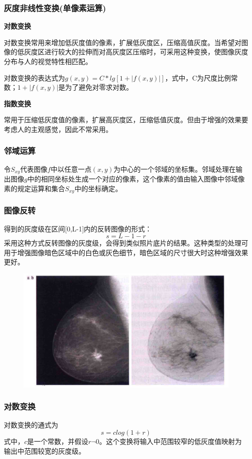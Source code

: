 \documentclass[11pt]{article}
\begin{document}
\subsubsection{灰度非线性变换(单像素运算)}
\textbf{对数变换}

对数变换常用来增加低灰度值的像素，扩展低灰度区，压缩高值灰度。当希望对图像的低灰度区进行较大的拉伸而对高灰度区压缩时，可采用这种变换，使图像灰度分布与人的视觉特性相匹配。

对数变换的表达式为$g(x,y) = C * lg[1+|f(x,y)|]$，式中，C为尺度比例常数；$1+|f(x,y)|$是为了避免对零求对数。

\textbf{指数变换}

常用于压缩低灰度值的像素，扩展高灰度区，压缩低值灰度。但由于增强的效果要考虑人的主观感觉，因此不常采用。
\subsubsection{邻域运算}
令$S_{xy}$代表图像$f$中以任意一点$(x,y)$为中心的一个邻域的坐标集。邻域处理在输出图像$g$中的相同坐标处生成一个对应的像素，这个像素的值由输入图像中邻域像素的规定运算和集合$S_{xy}$中的坐标确定。

\subsubsection{图像反转}
得到的灰度级在区间[0,L-1]内的反转图像的形式：
$$s = L - 1 - r$$
采用这种方式反转图像的灰度级，会得到类似照片底片的结果。这种类型的处理可用于增强图像暗色区域中的白色或灰色细节，暗色区域的尺寸很大时这种增强效果更好。
\begin{figure}[H]
	\centering
	\includegraphics[scale=0.6]{60}
\end{figure}
\subsubsection{对数变换}
对数变换的通式为
$$s = clog(1+r)$$
式中，$c$是一个常数，并假设$r\neg0$。这个变换将输入中范围较窄的低灰度值映射为输出中范围较宽的灰度级。
\end{document}
